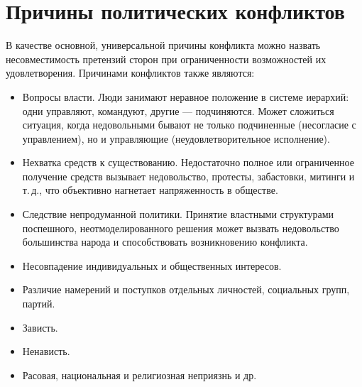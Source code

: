 \documentclass[a4paper,12pt,notitlepage,pdftex,headsepline]{scrartcl}
\begin{document}
\section{Причины политических конфликтов}
  В качестве основной, универсальной причины конфликта можно назвать
  несовместимость претензий сторон при ограниченности возможностей их
  удовлетворения.
  Причинами конфликтов также являются:
  \begin{itemize}
    \item Вопросы власти.
      Люди занимают неравное положение в системе иерархий: одни управляют,
      командуют, другие --- подчиняются.
      Может сложиться ситуация, когда недовольными бывают не только
      подчиненные (несогласие с управлением), но и управляющие
      (неудовлетворительное исполнение).
    \item Нехватка средств к существованию.
      Недостаточно полное или ограниченное получение средств вызывает
      недовольство, протесты, забастовки, митинги и т.\,д., что объективно
      нагнетает напряженность в обществе.
    \item Следствие непродуманной политики.
      Принятие властными структурами поспешного, неотмоделированного решения
      может вызвать недовольство большинства народа и способствовать
      возникновению конфликта.
    \item Несовпадение индивидуальных и общественных интересов.
    \item Различие намерений и поступков отдельных личностей, социальных
      групп, партий.
    \item Зависть.
    \item Ненависть.
    \item Расовая, национальная и религиозная неприязнь и др.
  \end{itemize}

  \clearpage
\end{document}
